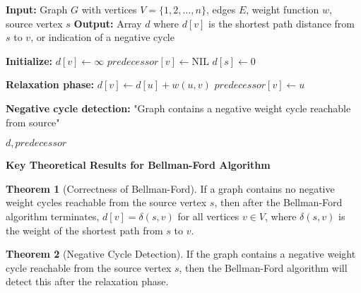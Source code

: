 \documentclass{article}
\theoremstyle{definition}
\newtheorem{theorem}{Theorem}
\begin{document}
\begin{algorithm}
\caption{Bellman-Ford Algorithm}
\begin{algorithmic}[1]
    \State \textbf{Input:} Graph $G$ with vertices $V = \{1, 2, \ldots, n\}$, edges $E$, weight function $w$, source vertex $s$
    \State \textbf{Output:} Array $d$ where $d[v]$ is the shortest path distance from $s$ to $v$, or indication of a negative cycle
    
    \State \textbf{Initialize:}
        \State $d[v] \gets \infty$ 
        \State $predecessor[v] \gets \text{NIL}$ 
    \EndFor
    \State $d[s] \gets 0$ 
    
    \State \textbf{Relaxation phase:}
     
             
                \State $d[v] \gets d[u] + w(u,v)$
                \State $predecessor[v] \gets u$
            \EndIf
        \EndFor
    \EndFor
    
    \State \textbf{Negative cycle detection:}
            \State \Return "Graph contains a negative weight cycle reachable from source"
        \EndIf
    \EndFor
    
    \State \Return $d, predecessor$ 
\EndProcedure
\end{algorithmic}
\end{algorithm}

\noindent\textbf{Key Theoretical Results for Bellman-Ford Algorithm}

\begin{theorem}[Correctness of Bellman-Ford]
If a graph contains no negative weight cycles reachable from the source vertex $s$, then after the Bellman-Ford algorithm terminates, $d[v] = \delta(s,v)$ for all vertices $v \in V$, where $\delta(s,v)$ is the weight of the shortest path from $s$ to $v$.
\end{theorem}

\begin{theorem}[Negative Cycle Detection]
If the graph contains a negative weight cycle reachable from the source vertex $s$, then the Bellman-Ford algorithm will detect this after the relaxation phase.
\end{theorem}
\end{document}
